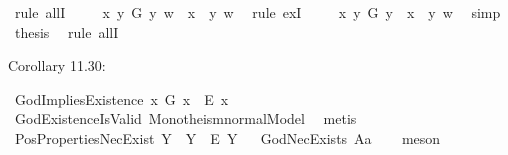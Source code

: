 \begin{isabellebody}
\ {\isacharparenleft}rule\ allI{\isacharparenright}\ \isanewline
\ \ \isamarkupfalse%
\ {\isachardoublequoteopen}{\isasymexists}x{\isachardot}\ {\isacharparenleft}{\isasymforall}y{\isachardot}\ G\ y\ w\ {\isasymlongleftrightarrow}\ {\isacharparenleft}x\ \isactrlbold {\isasymapprox}\ y{\isacharparenright}\ w{\isacharparenright}{\isachardoublequoteclose}\ \isamarkupfalse%
\ {\isacharparenleft}rule\ exI{\isacharparenright}\ \isanewline
\ \ \isamarkupfalse%
\ {\isachardoublequoteopen}{\isacharparenleft}\isactrlbold {\isasymexists}x{\isachardot}\ {\isacharparenleft}\isactrlbold {\isasymforall}y{\isachardot}\ G\ y\ \isactrlbold {\isasymleftrightarrow}\ {\isacharparenleft}x\ \isactrlbold {\isasymapprox}\ y{\isacharparenright}{\isacharparenright}{\isacharparenright}\ w{\isachardoublequoteclose}\ \isamarkupfalse%
\ simp\isanewline
\isacommand{{\isacharbraceright}}\isamarkupfalse%
\isanewline
{}\isamarkupfalse%
\ {\isacharquery}thesis\ \isamarkupfalse%
\ {\isacharparenleft}rule\ allI{\isacharparenright}\ \isanewline
{}\isamarkupfalse%
%
\endisatagproof
{\isafoldproof}%
%
\isadelimproof
%
\endisadelimproof
%
\begin{isamarkuptext}%
Corollary 11.30:%
\end{isamarkuptext}\isamarkuptrue%
\isamarkupfalse%
\ GodImpliesExistence{\isacharcolon}\ {\isachardoublequoteopen}{\isasymlfloor}\isactrlbold {\isasymforall}x{\isachardot}\ G\ x\ \isactrlbold {\isasymrightarrow}\ E{\isacharbang}\ x{\isasymrfloor}{\isachardoublequoteclose}\ \isanewline
%
\isadelimproof
\ \ %
\endisadelimproof
%
\isatagproof
{}\isamarkupfalse%
\ GodExistenceIsValid\ Monotheism{\isacharunderscore}normalModel\ \isamarkupfalse%
\ metis%
\endisatagproof
{\isafoldproof}%
%
\isadelimproof
%
\endisadelimproof
%
\isamarkuptrue%
\isamarkupfalse%
\ PosPropertiesNecExist{\isacharcolon}\ {\isachardoublequoteopen}{\isasymlfloor}\isactrlbold {\isasymforall}Y{\isachardot}\ {\isasymP}\ Y\ \isactrlbold {\isasymrightarrow}\ \isactrlbold {\isasymbox}\isactrlbold {\isasymexists}\isactrlsup E\ Y{\isasymrfloor}{\isachardoublequoteclose}%
\isadelimproof
\ %
\endisadelimproof
%
\isatagproof
{}\isamarkupfalse%
\ GodNecExists\ A{}a\isanewline
\ \ \isamarkupfalse%
\ meson\ %
%
\endisatagproof

\end{isabellebody}
